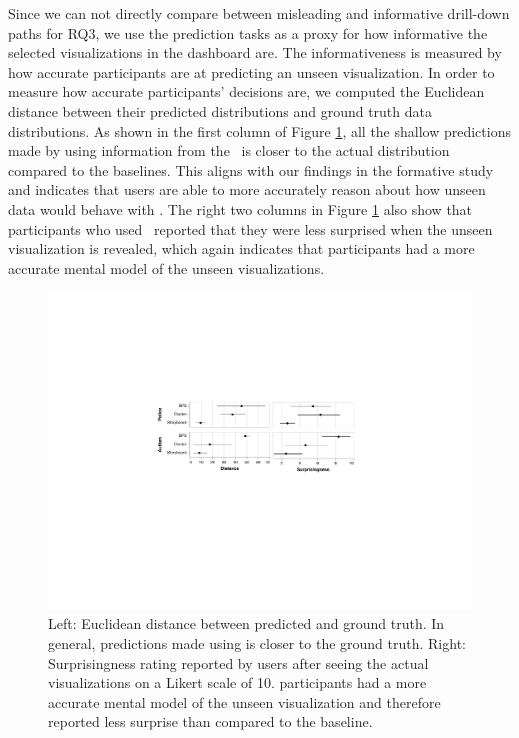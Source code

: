  Since we can not directly compare between misleading and informative drill-down paths for RQ3, we use the prediction tasks as a proxy for how informative the selected visualizations in the dashboard are. The informativeness is measured by how accurate participants are at predicting an unseen visualization. In order to measure how accurate participants' decisions are, we computed the Euclidean distance between their predicted distributions and ground truth data distributions. As shown in the first column of Figure \ref{fig:distance}, all the shallow predictions made by using information from the \system\ is closer to the actual distribution compared to the baselines. This aligns with our findings in the formative study and indicates that users are able to more accurately reason about how unseen data would behave with \system. The right two columns in Figure \ref{fig:distance} also show that participants who used \system\ reported that they were less surprised when the unseen visualization is revealed, which again indicates that participants had a more accurate mental model of the unseen visualizations.
\begin{figure}[h!]
\centering
\includegraphics[width=\linewidth]{figures/prediction_surprisingness_distance.pdf}
\caption{Left: Euclidean distance between predicted and ground truth. In general, predictions made using \system is closer to the ground truth. Right: Surprisingness rating reported by users after seeing the actual visualizations on a Likert scale of 10. \system participants had a more accurate mental model of the unseen visualization and therefore reported less surprise than compared to the baseline.}
\label{fig:distance}
\end{figure}
